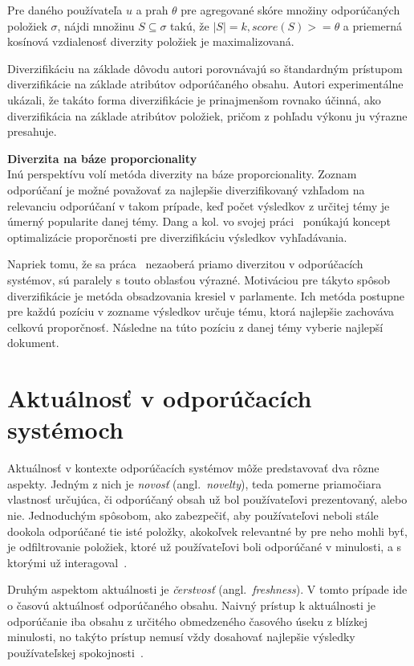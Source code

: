 \begin{adjustwidth}{1cm}{}
Pre daného používateľa $u$ a prah $\theta$ pre agregované skóre množiny odporúčaných položiek $\sigma$, nájdi množinu
$S \subseteq \sigma$ takú, že $|S| = k, score(S) >= \theta$ a priemerná kosínová vzdialenosť diverzity položiek je maximalizovaná.
\end{adjustwidth}

Diverzifikáciu na základe dôvodu autori porovnávajú so štandardným prístupom diverzifikácie na základe atribútov odporúčaného obsahu.
Autori experimentálne ukázali, že takáto forma diverzifikácie je prinajmenšom rovnako účinná, ako diverzifikácia na
základe atribútov položiek, pričom z pohľadu výkonu ju výrazne presahuje.

\textbf{Diverzita na báze proporcionality}\\
Inú perspektívu volí metóda diverzity na báze proporcionality. Zoznam odporúčaní je možné považovať za najlepšie diverzifikovaný
vzhľadom na relevanciu odporúčaní v takom prípade, keď počet výsledkov z určitej témy je úmerný popularite danej témy.
Dang a kol. vo svojej práci~\cite{Dang2012} ponúkajú koncept optimalizácie proporčnosti pre diverzifikáciu výsledkov
vyhľadávania.

Napriek tomu, že sa práca~\cite{Dang2012} nezaoberá priamo diverzitou v odporúčacích systémov, sú paralely s touto
oblasťou výrazné. Motiváciou pre tákyto spôsob diverzifikácie je metóda obsadzovania kresiel v parlamente. Ich metóda
postupne pre každú pozíciu v zozname výsledkov určuje tému, ktorá najlepšie zachováva celkovú proporčnosť. Následne
na túto pozíciu z danej témy vyberie najlepší dokument.


\section{Aktuálnosť v odporúčacích systémoch}

Aktuálnosť v kontexte odporúčacích systémov môže predstavovať dva rôzne aspekty. Jedným z nich je \emph{novosť}
(angl.~\emph{novelty}), teda pomerne priamočiara vlastnosť určujúca, či odporúčaný obsah už bol používateľovi prezentovaný,
alebo nie. Jednoduchým spôsobom, ako zabezpečiť, aby používateľovi neboli stále dookola odporúčané tie isté položky,
akokoľvek relevantné by pre neho mohli byť, je odfiltrovanie položiek, ktoré už používateľovi boli odporúčané v minulosti,
a s ktorými už interagoval~\cite{Handbook2011}.

Druhým aspektom aktuálnosti je \emph{čerstvosť} (angl.~\emph{freshness}). V tomto prípade ide o časovú aktuálnosť odporúčaného
obsahu. Naivný prístup k aktuálnosti je odporúčanie iba obsahu z určitého obmedzeného časového úseku z blízkej minulosti,
no takýto prístup nemusí vždy dosahovať najlepšie výsledky používateľskej spokojnosti~\cite{Szpektor2013}.

